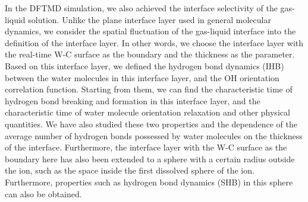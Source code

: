 In the DFTMD simulation, we also achieved the interface selectivity of the gas-liquid solution. Unlike the plane interface layer used in general molecular dynamics, we consider the spatial fluctuation of the gas-liquid interface into the definition of the interface layer. In other words, we choose the interface layer with the real-time W-C surface as the boundary and the thickness as the parameter. Based on this interface layer, we defined the hydrogen bond dynamics (IHB) between the water molecules in this interface layer, and the OH orientation correlation function. Starting from them, we can find the characteristic time of hydrogen bond breaking and formation in this interface layer, and the characteristic time of water molecule orientation relaxation and other physical quantities. We have also studied these two properties and the dependence of the average number of hydrogen bonds possessed by water molecules on the thickness of the interface. Furthermore, the interface layer with the W-C surface as the boundary here has also been extended to a sphere with a certain radius outside the ion, such as the space inside the first dissolved sphere of the ion. Furthermore, properties such as hydrogen bond dynamics (SHB) in this sphere can also be obtained.

